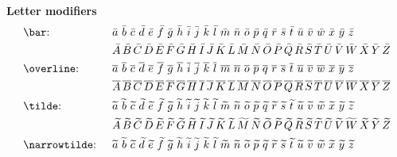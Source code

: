 \documentclass{myassignment}
\begin{document}
\textbf{Letter modifiers}
\begin{align*}
    &\text{\texttt{\textbackslash bar}: } &&\bar{a}\,\,\bar{b}\,\,\bar{c}\,\,\bar{d}\,\,\bar{e}\,\,\bar{f}\,\,\bar{g}\,\,\bar{h}\,\,\bar{i}\,\,\bar{j}\,\,\bar{k}\,\,\bar{l}\,\,\bar{m}\,\,\bar{n}\,\,\bar{o}\,\,\bar{p}\,\,\bar{q}\,\,\bar{r}\,\,\bar{s}\,\,\bar{t}\,\,\bar{u}\,\,\bar{v}\,\,\bar{w}\,\,\bar{x}\,\,\bar{y}\,\,\bar{z} \\
    &&&\bar{A}\,\bar{B}\,\bar{C}\,\bar{D}\,\bar{E}\,\bar{F}\,\bar{G}\,\bar{H}\,\bar{I}\,\bar{J}\,\bar{K}\,\bar{L}\,\bar{M}\,\bar{N}\,\bar{O}\,\bar{P}\,\bar{Q}\,\bar{R}\,\bar{S}\,\bar{T}\,\bar{U}\,\bar{V}\,\bar{W}\,\bar{X}\,\bar{Y}\,\bar{Z} \\
    &\text{\texttt{\textbackslash overline}: } &&\overline{a}\,\,\overline{b}\,\,\overline{c}\,\,\overline{d}\,\,\overline{e}\,\,\overline{f}\,\,\overline{g}\,\,\overline{h}\,\,\overline{i}\,\,\overline{j}\,\,\overline{k}\,\,\overline{l}\,\,\overline{m}\,\,\overline{n}\,\,\overline{o}\,\,\overline{p}\,\,\overline{q}\,\,\overline{r}\,\,\overline{s}\,\,\overline{t}\,\,\overline{u}\,\,\overline{v}\,\,\overline{w}\,\,\overline{x}\,\,\overline{y}\,\,\overline{z} \\
    &&&\overline{A}\,\overline{B}\,\overline{C}\,\overline{D}\,\overline{E}\,\overline{F}\,\overline{G}\,\overline{H}\,\overline{I}\,\overline{J}\,\overline{K}\,\overline{L}\,\overline{M}\,\overline{N}\,\overline{O}\,\overline{P}\,\overline{Q}\,\overline{R}\,\overline{S}\,\overline{T}\,\overline{U}\,\overline{V}\,\overline{W}\,\overline{X}\,\overline{Y}\,\overline{Z} \\
    &\text{\texttt{\textbackslash tilde}: } &&\tilde{a}\,\,\tilde{b}\,\,\tilde{c}\,\,\tilde{d}\,\,\tilde{e}\,\,\tilde{f}\,\,\tilde{g}\,\,\tilde{h}\,\,\tilde{i}\,\,\tilde{j}\,\,\tilde{k}\,\,\tilde{l}\,\,\tilde{m}\,\,\tilde{n}\,\,\tilde{o}\,\,\tilde{p}\,\,\tilde{q}\,\,\tilde{r}\,\,\tilde{s}\,\,\tilde{t}\,\,\tilde{u}\,\,\tilde{v}\,\,\tilde{w}\,\,\tilde{x}\,\,\tilde{y}\,\,\tilde{z} \\
    &&&\tilde{A}\,\tilde{B}\,\tilde{C}\,\tilde{D}\,\tilde{E}\,\tilde{F}\,\tilde{G}\,\tilde{H}\,\tilde{I}\,\tilde{J}\,\tilde{K}\,\tilde{L}\,\tilde{M}\,\tilde{N}\,\tilde{O}\,\tilde{P}\,\tilde{Q}\,\tilde{R}\,\tilde{S}\,\tilde{T}\,\tilde{U}\,\tilde{V}\,\tilde{W}\,\tilde{X}\,\tilde{Y}\,\tilde{Z} \\
    &\text{\texttt{\textbackslash narrowtilde}: } &&\narrowtilde{a}\,\,\narrowtilde{b}\,\,\narrowtilde{c}\,\,\narrowtilde{d}\,\,\narrowtilde{e}\,\,\narrowtilde{f}\,\,\narrowtilde{g}\,\,\narrowtilde{h}\,\,\narrowtilde{i}\,\,\narrowtilde{j}\,\,\narrowtilde{k}\,\,\narrowtilde{l}\,\,\narrowtilde{m}\,\,\narrowtilde{n}\,\,\narrowtilde{o}\,\,\narrowtilde{p}\,\,\narrowtilde{q}\,\,\narrowtilde{r}\,\,\narrowtilde{s}\,\,\narrowtilde{t}\,\,\narrowtilde{u}\,\,\narrowtilde{v}\,\,\narrowtilde{w}\,\,\narrowtilde{x}\,\,\narrowtilde{y}\,\,\narrowtilde{z} \\

\end{align*}
\end{document}
